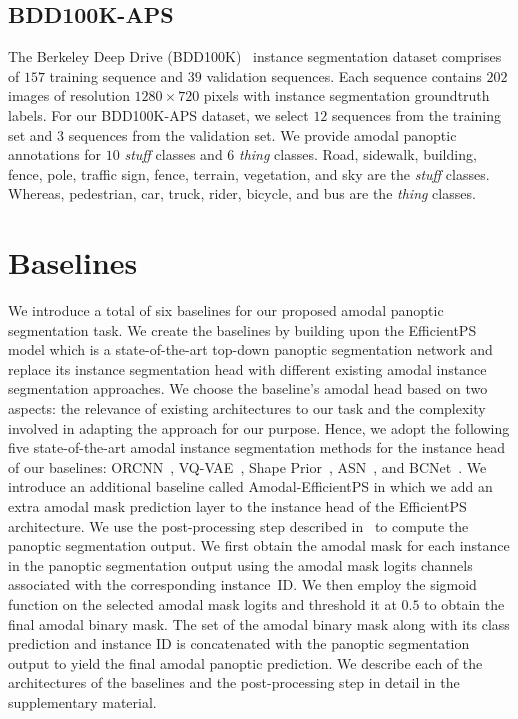 \documentclass[10pt,twocolumn,letterpaper]{article}
\begin{document}
\subsection{BDD100K-APS}

The Berkeley Deep Drive (BDD100K)~\cite{yu2018bdd100k} instance segmentation dataset comprises of $157$ training sequence and $39$ validation sequences. Each sequence contains $202$ images of resolution $1280\times720$ pixels with instance segmentation groundtruth labels. For our BDD100K-APS dataset, we select $12$ sequences from the training set and $3$ sequences from the validation set. We provide amodal panoptic annotations for $10$ \textit{stuff} classes and $6$ \textit{thing} classes. Road, sidewalk, building, fence, pole, traffic sign, fence, terrain, vegetation, and sky are the \textit{stuff} classes. Whereas, pedestrian, car, truck, rider, bicycle, and bus are the \textit{thing} classes. 
\section{Baselines}
We introduce a total of six baselines for our proposed amodal panoptic segmentation task. We create the baselines by building upon the EfficientPS~\cite{mohan2020efficientps} model which is a state-of-the-art top-down panoptic segmentation network and replace its instance segmentation head with different existing amodal instance segmentation approaches. We choose the baseline's amodal head based on two aspects: the relevance of existing architectures to our task and the complexity involved in adapting the approach for our purpose. Hence, we adopt the following five state-of-the-art amodal instance segmentation methods for the instance head of our baselines: ORCNN~\cite{follmann2019learning}, VQ-VAE~\cite{jang2020learning}, Shape Prior~\cite{yuting2021amodal}, ASN~\cite{qi2019amodal}, and BCNet~\cite{Ke_2021_CVPR}. We introduce an additional baseline called Amodal-EfficientPS in which we add an extra amodal mask prediction layer to the instance head of the EfficientPS architecture. We use the post-processing step described in~\cite{mohan2020efficientps} to compute the panoptic segmentation output. We first obtain the amodal mask for each instance in the panoptic segmentation output using the amodal mask logits channels associated with the corresponding instance~ID. We then employ the sigmoid function on the selected amodal mask logits and threshold it at $0.5$ to obtain the final amodal binary mask. The set of the amodal binary mask along with its class prediction and instance ID is concatenated with the panoptic segmentation output to yield the final amodal panoptic prediction. We describe each of the architectures of the baselines and the post-processing step in detail in the supplementary material. 
\end{document}
